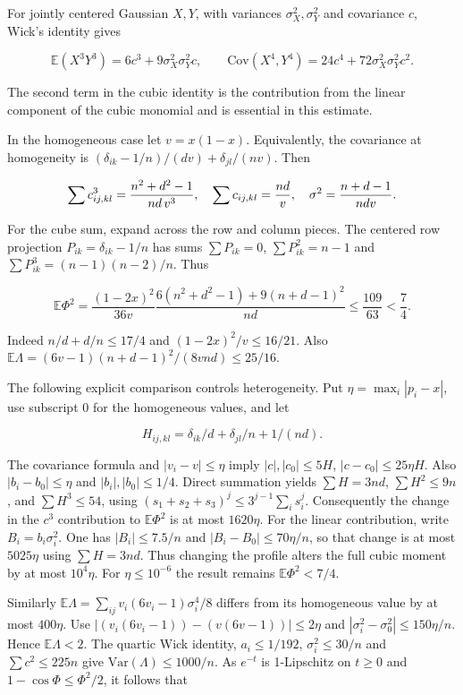 \documentclass[11pt]{article}
\begin{document}
For jointly centered Gaussian $X,Y$, with variances $\sigma_X^2,\sigma_Y^2$ and covariance $c$, Wick's identity gives

\[
\mathbb E(X^3Y^3)=6c^3+9\sigma_X^2\sigma_Y^2c,\qquad
\mathrm{Cov}(X^4,Y^4)=24c^4+72\sigma_X^2\sigma_Y^2c^2.
\]

The second term in the cubic identity is the contribution from the linear component of the cubic monomial and is essential in this estimate.

In the homogeneous case let $v=x(1-x)$. Equivalently, the covariance at homogeneity is $(\delta_{ik}-1/n)/(dv)+\delta_{jl}/(nv)$. Then

\[
\sum c_{ij,kl}^3=\frac{n^2+d^2-1}{nd\thinspace{}v^3},
\quad
\sum c_{ij,kl}=\frac{nd}{v},
\quad
\sigma^2=\frac{n+d-1}{ndv}.
\]

For the cube sum, expand across the row and column pieces. The centered row projection $P_{ik}=\delta_{ik}-1/n$ has sums $\sum P_{ik}=0$, $\sum P_{ik}^2=n-1$ and $\sum P_{ik}^3=(n-1)(n-2)/n$. Thus

\[
\mathbb E\Phi^2=
\frac{(1-2x)^2}{36v}\frac{6(n^2+d^2-1)+9(n+d-1)^2}{nd}
\le \frac{109}{63}<\frac74 .
\]

Indeed $n/d+d/n\le17/4$ and $(1-2x)^2/v\le16/21$. Also $\mathbb E\Lambda=(6v-1)(n+d-1)^2/(8vnd)\le25/16$.

The following explicit comparison controls heterogeneity. Put $\eta=\max_i|p_i-x|$, use subscript $0$ for the homogeneous values, and let

\[
H_{ij,kl}=\delta_{ik}/d+\delta_{jl}/n+1/(nd).
\]

The covariance formula and $|v_i-v|\le\eta$ imply $|c|,|c_0|\le5H$, $|c-c_0|\le25\eta H$. Also $|b_i-b_0|\le\eta$ and $|b_i|,|b_0|\le1/4$. Direct summation yields $\sum H=3nd$, $\sum H^2\le9n$, and $\sum H^3\le54$, using $(s_1+s_2+s_3)^j\le3^{j-1}\sum_i s_i^j$. Consequently the change in the $c^3$ contribution to $\mathbb E\Phi^2$ is at most $1620\eta$. For the linear contribution, write $B_i=b_i\sigma_i^2$. One has $|B_i|\le7.5/n$ and $|B_i-B_0|\le70\eta/n$, so that change is at most $5025\eta$ using $\sum H=3nd$. Thus changing the profile alters the full cubic moment by at most $10^4\eta$. For $\eta\le10^{-6}$ the result remains $\mathbb E\Phi^2<7/4$.

Similarly $\mathbb E\Lambda=\sum_{ij}v_i(6v_i-1)\sigma_i^4/8$ differs from its homogeneous value by at most $400\eta$. Use $|(v_i(6v_i-1))-(v(6v-1))|\le2\eta$ and $|\sigma_i^2-\sigma_0^2|\le150\eta/n$. Hence $\mathbb E\Lambda<2$. The quartic Wick identity, $a_i\le1/192$, $\sigma_i^2\le30/n$ and $\sum c^2\le225n$ give $\mathrm{Var}(\Lambda)\le1000/n$. As $e^{-t}$ is 1-Lipschitz on $t\ge0$ and $1-\cos \Phi\le\Phi^2/2$, it follows that
\end{document}

